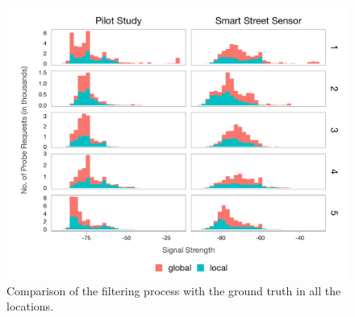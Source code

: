 \begin{figure}
  \includegraphics[trim={5 5 5 5}, clip]{images/processing-sss-signalsnew.png}
  \caption{Comparison of the filtering process with the ground truth in all the locations.}
  \label{figure:processing:sss:signals}
\end{figure}

